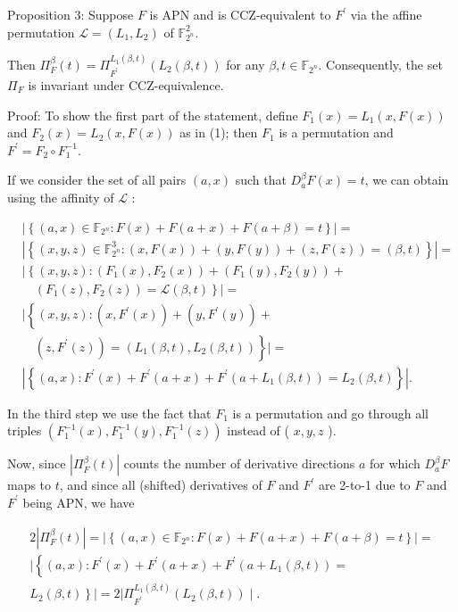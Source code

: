 \documentclass[10pt]{article}
\begin{document}
Proposition 3: Suppose $F$ is APN and is CCZ-equivalent to $F^{\prime}$ via the affine permutation $\mathcal{L}=\left(L_{1}, L_{2}\right)$ of $\mathbb{F}_{2^{n}}^{2}$.

Then $\Pi_{F}^{\beta}(t)=\Pi_{F^{\prime}}^{L_{1}(\beta, t)}\left(L_{2}(\beta, t)\right)$ for any $\beta, t \in \mathbb{F}_{2^{n}}$. Consequently, the set $\Pi_{F}$ is invariant under CCZ-equivalence.

Proof: To show the first part of the statement, define $F_{1}(x)=L_{1}(x, F(x))$ and $F_{2}(x)=L_{2}(x, F(x))$ as in (1); then $F_{1}$ is a permutation and $F^{\prime}=F_{2} \circ F_{1}^{-1}$.

If we consider the set of all pairs $(a, x)$ such that $D_{a}^{\beta} F(x)=t$, we can obtain using the affinity of $\mathcal{L}$ :

$$
\begin{aligned}
& \left|\left\{(a, x) \in \mathbb{F}_{2^{n}}: F(x)+F(a+x)+F(a+\beta)=t\right\}\right|= \\
& \left|\left\{(x, y, z) \in \mathbb{F}_{2^{n}}^{3}:(x, F(x))+(y, F(y))+(z, F(z))=(\beta, t)\right\}\right|= \\
& \mid\left\{(x, y, z):\left(F_{1}(x), F_{2}(x)\right)+\left(F_{1}(y), F_{2}(y)\right)+\right. \\
& \left.\quad\left(F_{1}(z), F_{2}(z)\right)=\mathcal{L}(\beta, t)\right\} \mid= \\
& \mid\left\{(x, y, z):\left(x, F^{\prime}(x)\right)+\left(y, F^{\prime}(y)\right)+\right. \\
& \left.\quad\left(z, F^{\prime}(z)\right)=\left(L_{1}(\beta, t), L_{2}(\beta, t)\right)\right\} \mid= \\
& \left|\left\{(a, x): F^{\prime}(x)+F^{\prime}(a+x)+F^{\prime}\left(a+L_{1}(\beta, t)\right)=L_{2}(\beta, t)\right\}\right| .
\end{aligned}
$$

In the third step we use the fact that $F_{1}$ is a permutation and go through all triples $\left(F_{1}^{-1}(x), F_{1}^{-1}(y), F_{1}^{-1}(z)\right)$ instead of ( $x, y, z$ ).

Now, since $\left|\Pi_{F}^{\beta}(t)\right|$ counts the number of derivative directions $a$ for which $D_{a}^{\beta} F$ maps to $t$, and since all (shifted) derivatives of $F$ and $F^{\prime}$ are 2-to-1 due to $F$ and $F^{\prime}$ being APN, we have


\begin{gather*}
2\left|\Pi_{F}^{\beta}(t)\right|=\left|\left\{(a, x) \in \mathbb{F}_{2^{n}}: F(x)+F(a+x)+F(a+\beta)=t\right\}\right|= \\
\mid\left\{(a, x): F^{\prime}(x)+F^{\prime}(a+x)+F^{\prime}\left(a+L_{1}(\beta, t)\right)=\right. \\
\left.L_{2}(\beta, t)\right\}|=2| \Pi_{F^{\prime}}^{L_{1}(\beta, t)}\left(L_{2}(\beta, t)\right) \mid . \tag{6}
\end{gather*}
\end{document}
